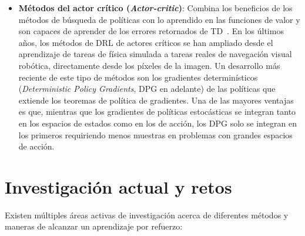 \begin{itemize}
    \item \textbf{Métodos del actor crítico (\textit{Actor-critic})}: Combina los beneficios de los métodos de búsqueda de políticas con lo aprendido en las funciones de valor y son capaces de aprender de los errores retornados de TD~\cite{eric_kolve}. En los últimos años, los métodos de DRL de actores críticos se han ampliado desde el aprendizaje de tareas de física simulada a tareas reales de navegación visual robótica, directamente desde los píxeles de la imagen. Un desarrollo más reciente de este tipo de métodos son los gradientes determinísticos (\textit{Deterministic Policy Gradients}, DPG en adelante) de las políticas que extiende los teoremas de política de gradientes. Una de las mayores ventajas es que, mientras que los gradientes de políticas estocásticas se integran tanto en los espacios de estados como en los de acción, los DPG solo se integran en los primeros requiriendo menos muestras en problemas con grandes espacios de acción.
\end{itemize}

\section{Investigación actual y retos}

Existen múltiples áreas activas de investigación acerca de diferentes métodos y maneras de alcanzar un aprendizaje por refuerzo:\\

